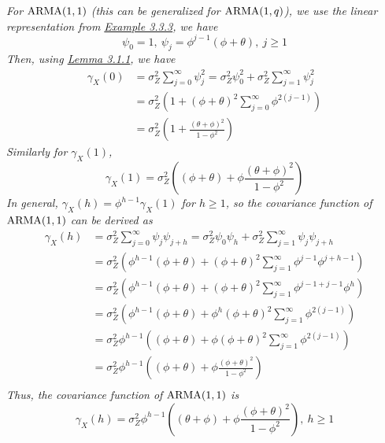 \begin{example}[ARMA(1,1)]
    \emph{
        For $\operatorname{ARMA}(1,1)$ (this can be generalized for $\operatorname{ARMA}(1,q)$), we use the linear representation from \hyperref[ex:linear_arma11]{Example 3.3.3}, we have 
        \[\psi_0 = 1, \ \psi_j = \phi^{j-1}(\phi + \theta), \ j \geq 1\]
        Then, using \hyperref[lemma:linear_acf]{Lemma 3.1.1}, we have
        \begin{align*}
            \gamma_X(0) &= \sigma_Z^2\sum_{j=0}^\infty \psi_j^2 =\sigma_Z^2\psi_0^2 + \sigma_Z^2 \sum_{j=1}^\infty \psi_j^2\\
            &= \sigma_Z^2 \left(1 + (\phi + \theta)^2 \sum_{j=0}^\infty \phi^{2(j-1)}\right)\\
            &= \sigma_Z^2 \left(1 + \frac{(\theta + \phi)^2}{1-\phi^2}\right)
        \end{align*}
        Similarly for $\gamma_X(1)$, 
        \[\gamma_X(1) = \sigma_Z^2 \left((\phi + \theta) + \phi \frac{(\theta + \phi)^2}{1-\phi^2}\right)\]
        In general, $\gamma_X(h) = \phi^{h-1}\gamma_X(1)$ for $h \geq 1$, so the covariance function of $\operatorname{ARMA}(1,1)$ can be derived as
        \begin{align*}
            \gamma_X(h) &= \sigma_Z^2\sum_{j=0}^\infty \psi_j\psi_{j+h} = \sigma_Z^2\psi_0\psi_h + \sigma_Z^2 \sum_{j=1}^\infty \psi_j\psi_{j+h}\\
            &= \sigma_Z^2\left(\phi^{h-1}(\phi + \theta) + (\phi + \theta)^2\sum_{j=1}^\infty\phi^{j-1}\phi^{j+h-1}\right)\\
            &=\sigma_Z^2\left(\phi^{h-1}(\phi + \theta) + (\phi + \theta)^2\sum_{j=1}^\infty\phi^{j-1 + j - 1}\phi^{h}\right)\\
            &=\sigma_Z^2\left(\phi^{h-1}(\phi + \theta) + \phi^h(\phi + \theta)^2\sum_{j=1}^\infty\phi^{2(j-1)}\right)\\
            &=\sigma_Z^2\phi^{h-1}\left((\phi + \theta) + \phi(\phi + \theta)^2\sum_{j=1}^\infty\phi^{2(j-1)}\right)\\
            &= \sigma_Z^2\phi^{h-1}\left((\phi + \theta) + \phi\frac{(\phi + \theta)^2}{1-\phi^2}\right)\\
        \end{align*}
        Thus, the covariance function of $\operatorname{ARMA}(1,1)$ is
        \[\gamma_X(h) = \sigma_Z^2\phi^{h-1}\left((\theta+\phi) + \phi \frac{(\phi + \theta)^2}{1-\phi^2}\right), \ h \geq 1\]
    }
\end{example}
